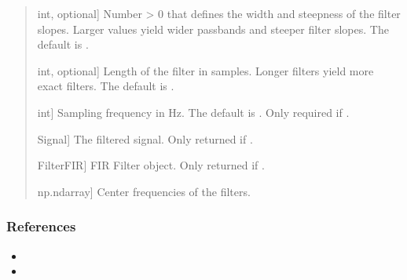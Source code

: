 \documentclass[letterpaper,10pt,english]{sphinxmanual}
\begin{document}
\begin{fulllineitems}
\begin{quote}
\begin{description}
\begin{description}
\sphinxlineitem{\sphinxstylestrong{slope}}{[}int, optional{]}
\sphinxAtStartPar
Number \textgreater{} 0 that defines the width and steepness of the filter slopes.
Larger values yield wider pass\sphinxhyphen{}bands and steeper filter slopes. The
default is .

\sphinxlineitem{\sphinxstylestrong{n\_samples}}{[}int, optional{]}
\sphinxAtStartPar
Length of the filter in samples. Longer filters yield more exact
filters. The default is .

\sphinxlineitem{\sphinxstylestrong{sampling\_rate}}{[}int{]}
\sphinxAtStartPar
Sampling frequency in Hz. The default is . Only required if
.

\end{description}

\begin{description}
\sphinxlineitem{\sphinxstylestrong{signal}}{[}Signal{]}
\sphinxAtStartPar
The filtered signal. Only returned if .

\sphinxlineitem{\sphinxstylestrong{filter}}{[}FilterFIR{]}
\sphinxAtStartPar
FIR Filter object. Only returned if .

\sphinxlineitem{\sphinxstylestrong{frequencies}}{[}np.ndarray{]}
\sphinxAtStartPar
Center frequencies of the filters.

\end{description}

\end{description}\end{quote}
\subsubsection*{References}
\begin{itemize}
\item {} 
\sphinxAtStartPar
{}

\item {} 
\sphinxAtStartPar
{}

\end{itemize}

\end{fulllineitems}


\sphinxstepscope
\end{document}
